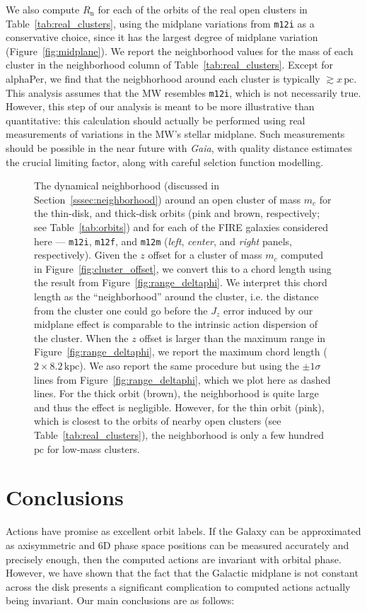 \documentclass[twocolumn]{aastex62}
\newcommand{\pc}{\text{pc}}
\newcommand{\kpc}{\text{kpc}}
\newcommand{\mi}{\texttt{m12i}}
\newcommand{\mf}{\texttt{m12f}}
\newcommand{\mm}{\texttt{m12m}}
\newcommand{\n}{\text{n}}
\newcommand{\thincolor}{pink}
\newcommand{\thickcolor}{brown}
\begin{document}
We also compute $R_{\n}$ for each of the orbits of the real open clusters in
Table~\ref{tab:real_clusters}, using the midplane variations from
\mi{} as a conservative choice, since it has the largest degree of
midplane variation (Figure~\ref{fig:midplane}). We report the neighborhood
values for the mass of each cluster in the neighborhood column of
Table~\ref{tab:real_clusters}. Except for alphaPer, we find that the
neigbhorhood around each cluster is typically $\gtrsim x\,\pc$. This analysis
assumes that the MW resembles \mi{}, which is not necessarily true. However,
this step of our analysis is meant to be more illustrative than quantitative:
this calculation should actually be performed using real measurements of
variations in the MW's stellar midplane. Such measurements should be possible
in the near future with {\em Gaia}, with quality distance estimates the
crucial limiting factor, along with careful selction function modelling.

\begin{figure}
\caption{The dynamical neighborhood (discussed in
Section~\ref{sssec:neighborhood}) around an open cluster of mass $m_c$ for the
thin-disk, and thick-disk orbits (\thincolor{} and \thickcolor{},
respectively; see Table~\ref{tab:orbits}) and for each of the FIRE galaxies
considered here ---
\mi{}, \mf{}, and \mm{} ({\em left}, {\em center}, and {\em right} panels,
respectively). Given the $z$ offset for a cluster of mass $m_c$ computed in
Figure~\ref{fig:cluster_offset}, we convert this to a chord length using the
result from Figure~\ref{fig:range_deltaphi}. We interpret this chord length as
the ``neighborhood'' around the cluster, i.e. the distance from the cluster
one could go before the $J_z$ error induced by our midplane effect is
comparable to the intrinsic action dispersion of the cluster. When the $z$
offset is larger than the maximum range in Figure~\ref{fig:range_deltaphi}, we
report the maximum chord length ($2\times8.2\,\kpc$). We aso report the same
procedure but using the $\pm1\sigma$ lines from
Figure~\ref{fig:range_deltaphi}, which we plot here as dashed lines. For the
thick orbit (\thickcolor), the neighborhood is quite large and thus the effect
is negligible. However, for the thin orbit (\thincolor), which is closest to
the orbits of nearby open clusters (see Table~\ref{tab:real_clusters}), the
neighborhood is only a few hundred $\pc$ for low-mass clusters.}
\label{fig:Rn_mc}
\end{figure}

\section{Conclusions}\label{sec:conclusion}
Actions have promise as excellent orbit labels. If the Galaxy can be
approximated as axisymmetric and 6D phase space positions can be measured
accurately and precisely enough, then the computed actions are invariant with
orbital phase. However, we have shown that the fact that the Galactic midplane
is not constant across the disk presents a significant complication to
computed actions actually being invariant. Our main conclusions are as
follows:
\end{document}
